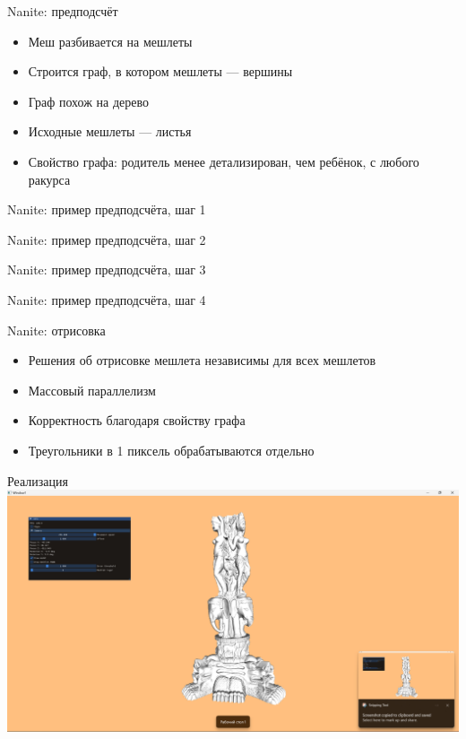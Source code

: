 \documentclass{beamer}
\begin{document}
    \begin{frame}{Nanite: предподсчёт}
        \begin{itemize}
            \item Меш разбивается на мешлеты
            \item Строится граф, в котором мешлеты --- вершины
            \item Граф похож на дерево
            \item Исходные мешлеты --- листья
            \item \alert{Свойство графа: родитель менее детализирован, чем ребёнок, с любого ракурса}
        \end{itemize}
    \end{frame}

    \begin{frame}{Nanite: пример предподсчёта, шаг 1}
        \centering 
    \end{frame}

    \begin{frame}{Nanite: пример предподсчёта, шаг 2}
        \centering 
    \end{frame}

    \begin{frame}{Nanite: пример предподсчёта, шаг 3}
        \centering 
    \end{frame}

    \begin{frame}{Nanite: пример предподсчёта, шаг 4}
        \centering 
    \end{frame}

    \begin{frame}{Nanite: отрисовка}
        \begin{itemize}
            \item \alert{Решения об отрисовке мешлета независимы для всех мешлетов}
            \item Массовый параллелизм
            \item Корректность благодаря свойству графа
            \item Треугольники в 1 пиксель обрабатываются отдельно
        \end{itemize}
    \end{frame}

    \begin{frame}{Реализация}
        \includegraphics[width=\textwidth]{demo-0.png}
    \end{frame}
\end{document}
